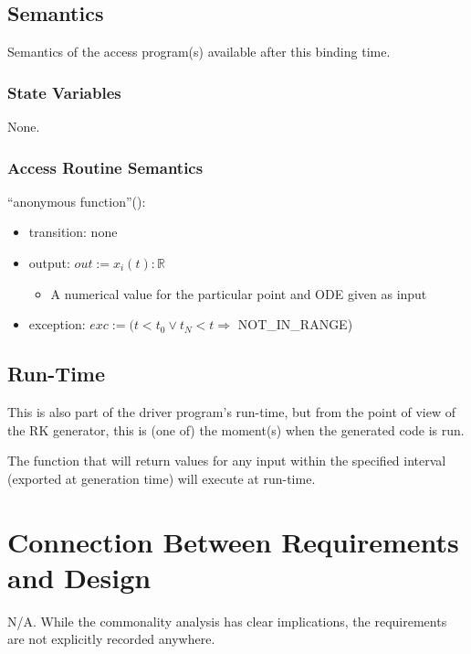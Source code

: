 \documentclass[12pt, titlepage]{article}
\begin{document}
\subsection{Semantics}
Semantics of the access program(s) available after this binding time.

\subsubsection{State Variables}
None.

\subsubsection{Access Routine Semantics}

\noindent ``anonymous function''():
\begin{itemize}
  \item transition: none
  \item output: $out := x_{i}(t) : \mathbb{R}$
  \begin{itemize}
    \item A numerical value for the particular point and ODE given as input
  \end{itemize}
  \item exception: $exc := (t < t_0 \lor t_N < t \Rightarrow$ NOT\_IN\_RANGE)
\end{itemize}
\subsection{Run-Time}\label{ssec:run-time}
This is also part of the driver program's run-time, but from the point of view 
of the RK generator, this is (one of) the moment(s) when the generated code is 
run.

The function that will return values for any input within the specified 
interval (exported at generation time) will execute at run-time.




\section{Connection Between Requirements and Design} \label{SecConnection}

N/A. While the commonality analysis has clear implications, the requirements 
are not explicitly recorded anywhere. 
\end{document}
